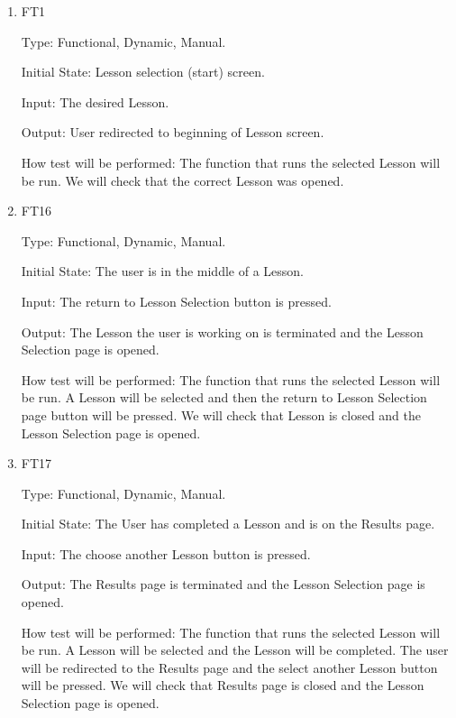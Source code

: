 \documentclass[12pt, titlepage]{article}
\begin{document}
\begin{enumerate}

\item{{\color{cyan}FT1}\\}

Type: Functional, Dynamic, Manual.
					
Initial State: Lesson selection (start) screen.
					
Input: The desired Lesson.
					
Output: User redirected to beginning of Lesson screen.
					
How test will be performed: The function that runs the selected Lesson will be run. We will check that the correct Lesson was opened.

\item{{\color{cyan}FT16}\\}
{\color{cyan}
Type: Functional, Dynamic, Manual.
					
Initial State: The user is in the middle of a Lesson.
					
Input: The return to Lesson Selection button is pressed.
					
Output: The Lesson the user is working on is terminated and the Lesson Selection page is opened.
					
How test will be performed: The function that runs the selected Lesson will be run. A Lesson will be selected and then the return to Lesson Selection page button will be pressed. We will check that Lesson is closed and the Lesson Selection page is opened.
}

\item{{\color{cyan}FT17}\\}
{\color{cyan}
Type: Functional, Dynamic, Manual.
					
Initial State: The User has completed a Lesson and is on the Results page.
					
Input: The choose another Lesson button is pressed.
					
Output: The Results page is terminated and the Lesson Selection page is opened.
					
How test will be performed: The function that runs the selected Lesson will be run. A Lesson will be selected and the Lesson will be completed. The user will be redirected to the Results page and the select another Lesson button will be pressed. We will check that Results page is closed and the Lesson Selection page is opened.
}
\end{enumerate}
\end{document}
